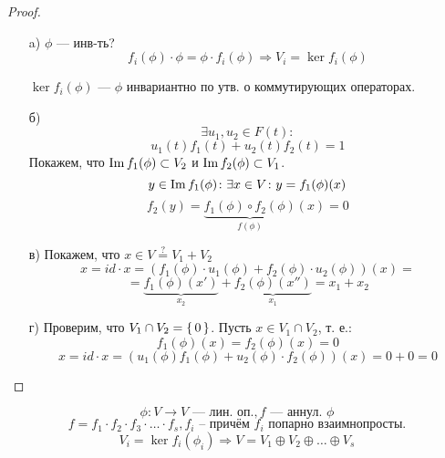\begin{proof}
\begin{itemize}
  \item [a) ] $\phi$ --- инв-ть?
    \[
    f_i(\phi) \cdot \phi = \phi \cdot f_i(\phi) \Rightarrow V_i = \ker f_i(\phi)     \]

        $\ker f_i(\phi) \text{ --- } \phi$ инвариантно по утв. о коммутирующих операторах.
\item [б) ]
    \[
    \exists u_1, u_2 \in F(t)\colon 
    \]
    \[
    u_1(t) f_1(t) + u_2(t) f_2(t) = 1
    \]
    Покажем, что $\operatorname{Im} f_1(\phi) \subset V_2$ и $\operatorname{Im} f_2(\phi) \subset V_1$.
    \[
    y \in \operatorname{Im} f_1(\phi) \colon \exists x \in V \colon y = f_1(\phi)(x)
    \]
    \[
    f_2(y) = \underbrace{f_1(\phi) \circ f_2(\phi)}_{f(\phi)} (x) = 0
    \]
  \item [в) ] Покажем, что $x \in V \overset{?}{=} V_1 + V_2$
    \[
    x = id \cdot x = (f_1(\phi) \cdot u_1(\phi) + f_2(\phi) \cdot u_2(\phi))(x) = 
    \]
    \[
    = \underbrace{f_1(\phi)(x')}_{x_2} + \underbrace{f_2(\phi) (x'')}_{x_1} = x_1 + x_2
    \]
  \item [г) ] Проверим, что $V_1 \cap V_2 = \set{0}$. Пусть $x \in V_1 \cap V_2$, т. е.:
    \[
    f_1(\phi)(x) = f_2(\phi)(x) = 0
    \]
    \[
    x = id \cdot x = (u_1(\phi) f_1(\phi) + u_2(\phi) \cdot f_2(\phi))(x) = 0 + 0 = 0
    \]
\end{itemize}
\end{proof}
\begin{consequence}
\label{consequence:05_4}
\[
  \phi \colon V \rightarrow V \text{ --- лин. оп.}, f \text{ --- аннул. $\phi$}
\]
\[
  f = f_1 \cdot f_2 \cdot f_3 \cdot \ldots \cdot f_s, f_i \text{ -- причём $f_i$ попарно взаимнопросты.}
\]
\[
  V_i = \ker f_i(\phi_i) \Rightarrow V = V_1 \oplus V_2 \oplus \ldots \oplus V_s
\]
\end{consequence}
